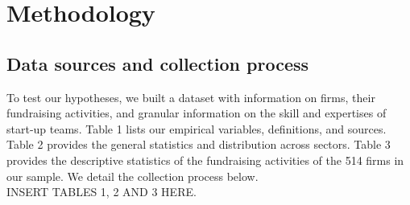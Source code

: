 \documentclass[12pt]{article}
\begin{document}
\section{Methodology}

\subsection{Data sources and collection process}

To test our hypotheses, we built a dataset with information on firms, their fundraising activities, and granular information on the skill and expertises of start-up teams. Table 1 \label{table1} lists our empirical variables, definitions, and sources. Table 2\label{table2} provides the general statistics and distribution across sectors. Table 3\label{table3} provides the descriptive statistics of the fundraising activities of the 514 firms in our sample. We detail the collection process below. \\

INSERT TABLES 1, 2 AND 3 HERE. \\
\end{document}

